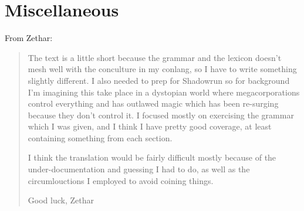 \documentclass{thiguka}
\begin{document}
\section{Miscellaneous}

From Zethar:

\begin{quote}
The text is a little short because the grammar and the lexicon doesn’t mesh well with the conculture in my conlang, so I have to write something slightly different.
I also needed to prep for Shadowrun so for background I’m imagining this take place in a dystopian world where megacorporations control everything and has outlawed magic which has been re-surging because they don’t control it.
I focused mostly on exercising the grammar which I was given, and I think I have pretty good coverage, at least containing something from each section.

I think the translation would be fairly difficult mostly because of the under-documentation and guessing I had to do, as well as the circumlouctions I employed to avoid coining things.

Good luck, Zethar
\end{quote}
\end{document}
